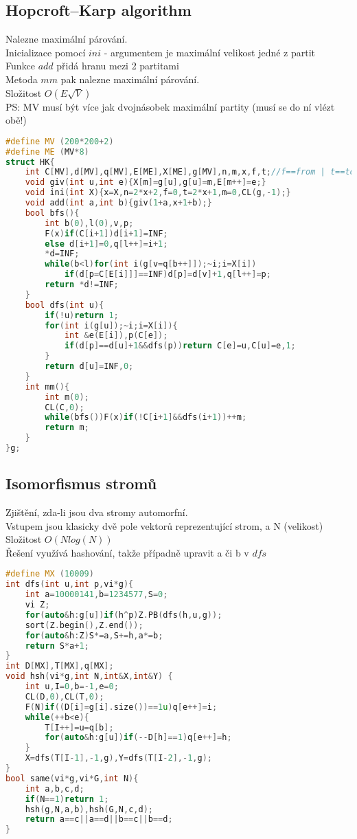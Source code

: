 \documentclass[11pt]{article}
\begin{document}
\subsection{Hopcroft–Karp algorithm}
Nalezne maximální párování.
\\Inicializace pomocí $ini$ - argumentem je maximální velikost jedné z partit
\\Funkce $add$ přidá hranu mezi 2 partitami
\\Metoda $mm$ pak nalezne maximální párování.
\\Složitost $O(E\sqrt{V})$
\\PS: MV musí být více jak dvojnásobek maximální partity (musí se do ní vlézt obě!)
\begin{lstlisting}[language=C++]
#define MV (200*200+2)
#define ME (MV*8)
struct HK{
    int C[MV],d[MV],q[MV],E[ME],X[ME],g[MV],n,m,x,f,t;//f==from | t==to
    void giv(int u,int e){X[m]=g[u],g[u]=m,E[m++]=e;}
    void ini(int X){x=X,n=2*x+2,f=0,t=2*x+1,m=0,CL(g,-1);}
    void add(int a,int b){giv(1+a,x+1+b);}
    bool bfs(){
        int b(0),l(0),v,p;
        F(x)if(C[i+1])d[i+1]=INF;
        else d[i+1]=0,q[l++]=i+1;
        *d=INF;
        while(b<l)for(int i(g[v=q[b++]]);~i;i=X[i])
            if(d[p=C[E[i]]]==INF)d[p]=d[v]+1,q[l++]=p;
        return *d!=INF;
    }
    bool dfs(int u){
        if(!u)return 1;
        for(int i(g[u]);~i;i=X[i]){
            int &e(E[i]),p(C[e]);
            if(d[p]==d[u]+1&&dfs(p))return C[e]=u,C[u]=e,1;
        }
        return d[u]=INF,0;
    }
    int mm(){
        int m(0);
        CL(C,0);
        while(bfs())F(x)if(!C[i+1]&&dfs(i+1))++m;
        return m;
    }
}g;
\end{lstlisting}
\subsection{Isomorfismus stromů}
Zjištění, zda-li jsou dva stromy automorfní.
\\Vstupem jsou klasicky dvě pole vektorů reprezentující strom, a \textsf{N} (velikost)
\\Složitost $O(Nlog(N))$
\\Řešení využívá hashování, takže případně upravit \textsf{a} či \textsf{b} v $dfs$
\begin{lstlisting}[language=C++]
#define MX (10009)
int dfs(int u,int p,vi*g){
    int a=10000141,b=1234577,S=0;
    vi Z;
    for(auto&h:g[u])if(h^p)Z.PB(dfs(h,u,g));
    sort(Z.begin(),Z.end());
    for(auto&h:Z)S*=a,S+=h,a*=b;
    return S*a+1;
}
int D[MX],T[MX],q[MX];
void hsh(vi*g,int N,int&X,int&Y) {
    int u,I=0,b=-1,e=0;
    CL(D,0),CL(T,0);
    F(N)if((D[i]=g[i].size())==1u)q[e++]=i;
    while(++b<e){
        T[I++]=u=q[b];
        for(auto&h:g[u])if(--D[h]==1)q[e++]=h;
    }
    X=dfs(T[I-1],-1,g),Y=dfs(T[I-2],-1,g);
}
bool same(vi*g,vi*G,int N){
    int a,b,c,d;
    if(N==1)return 1;
    hsh(g,N,a,b),hsh(G,N,c,d);
    return a==c||a==d||b==c||b==d;
}
\end{lstlisting}
\end{document}
